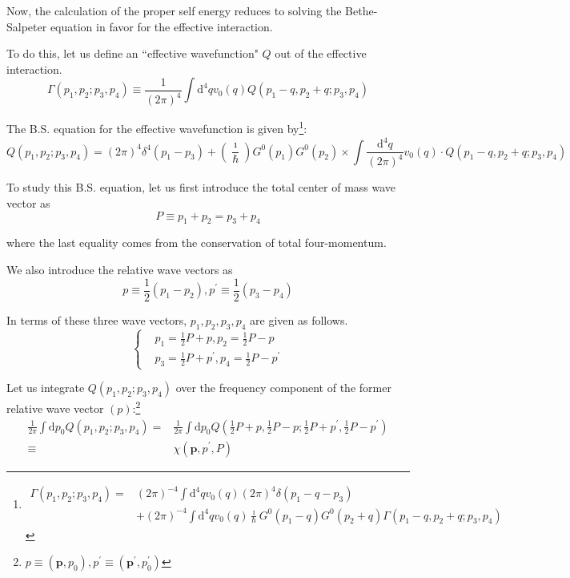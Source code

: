 Now, the calculation of the proper self energy reduces to solving the Bethe-Salpeter equation in favor for the effective interaction.

To do this, let us define an ``effective wavefunction" $Q$ out of the effective interaction.
\begin{equation} \label{Eqs2.7.7}
\Gamma(p_1,p_2;p_3,p_4) \equiv \frac{1}{(2\pi)^4} \int \mathrm{d}^4 q v_0(q) Q(p_1-q,p_2+q;p_3,p_4)
\end{equation}

The B.S. equation for the effective wavefunction is given by\footnote{\[ \begin{split} \Gamma(p_1,p_2;p_3,p_4) =& (2\pi)^{-4} \int \mathrm{d}^4 q v_0(q) (2\pi)^4 \delta(p_1-q-p_3) \\&+ (2\pi)^{-4} \int \mathrm{d}^4 q v_0(q) \frac{\imath}{\hbar}G^0(p_1-q)G^0(p_2+q)\Gamma(p_1-q,p_2+q;p_3,p_4) \end{split} \]}:
\begin{equation} \label{Eqs2.7.8}
Q(p_1,p_2;p_3,p_4) = (2\pi)^4 \delta^4(p_1-p_3) + \left(\frac{\imath}{\hbar}\right) G^0(p_1)G^0(p_2) \times \int \frac{\mathrm{d}^4 q}{(2\pi)^4} v_0(q)\cdot Q(p_1-q,p_2+q;p_3,p_4)
\end{equation}

To study this B.S. equation, let us first introduce the total center of mass wave vector as
\begin{equation} \label{Eqs2.7.9} P \equiv p_1+p_2 = p_3 + p_4 \end{equation}

where the last equality comes from the conservation of total four-momentum.

We also introduce the relative wave vectors as
\begin{equation} \label{Eqs2.7.10} p \equiv \frac{1}{2}(p_1-p_2), p^{'} \equiv \frac{1}{2}(p_3-p_4) \end{equation}

In terms of these three wave vectors, $p_1,p_2,p_3,p_4$ are given as follows.
\begin{equation} \label{Eqs2.7.11} \left \{ \begin{split} &p_1 = \frac{1}{2}P+p, p_2 = \frac{1}{2}P-p \\ &p_3 = \frac{1}{2}P+p^{'} , p_4 = \frac{1}{2}P-p^{'}
\end{split} \right. \end{equation}

Let us integrate $Q(p_1,p_2;p_3,p_4)$ over the frequency component of the former relative wave vector $(p)$:\footnote{$p \equiv (\mathbf{p},p_0), p^{'} \equiv (\mathbf{p}^{'},p_0^{'})$}
\begin{equation} \label{2.7.12} \begin{split}
\frac{1}{2\pi} \int \mathrm{d}p_0 Q(p_1,p_2;p_3,p_4) =
& \frac{1}{2\pi} \int \mathrm{d}p_0 Q(\frac{1}{2}P+p,\frac{1}{2}P-p;\frac{1}{2}P+p^{'},\frac{1}{2}P-p^{'})\\
\equiv & \chi(\mathbf{p},p^{'},P)
\end{split}\end{equation}

